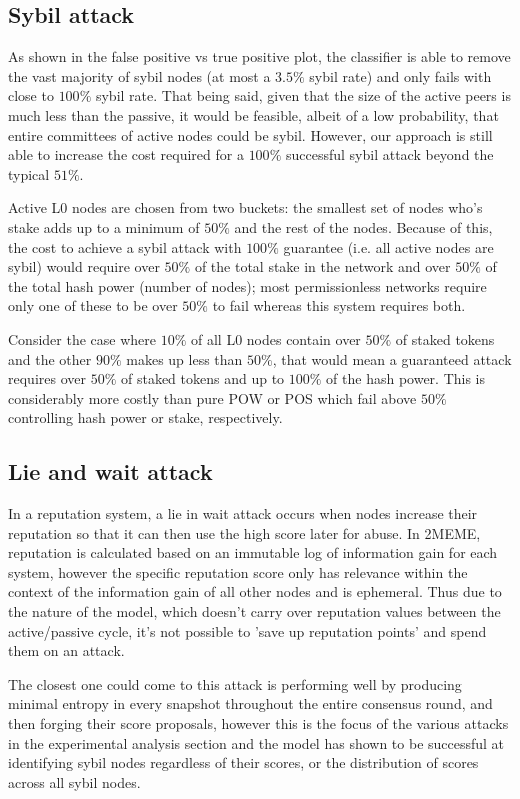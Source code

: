 \documentclass{article}
\begin{document}
\subsection{Sybil attack}
As shown in the false positive vs true positive plot, the classifier is able to remove the vast majority of sybil nodes (at most a $3.5\%$ sybil rate) and only fails with close to $100\%$ sybil rate. That being said, given that the size of the active peers is much less than the passive, it would be feasible, albeit of a low probability, that entire committees of active nodes could be sybil. However, our approach is still able to increase the cost required for a $100\%$ successful sybil attack beyond the typical $51\%$. 

Active L0 nodes are chosen from two buckets: the smallest set of nodes who's stake adds up to a minimum of $50\%$ and the rest of the nodes. Because of this, the cost to achieve a sybil attack with $100\%$ guarantee (i.e. all active nodes are sybil) would require over $50\%$ of the total stake in the network and over $50\%$ of the total hash power (number of nodes); most permissionless networks require only one of these to be over $50\%$ to fail whereas this system requires both.

Consider the case where $10\%$ of all L0 nodes contain over $50\%$ of staked tokens and the other $90\%$ makes up less than $50\%$, that would mean a guaranteed attack requires over $50\%$ of staked tokens and up to $100\%$ of the hash power. This is considerably more costly than pure POW or POS which fail above $50\%$ controlling hash power or stake, respectively.

\subsection{Lie and wait attack}
In a reputation system, a lie in wait attack occurs when nodes increase their reputation so that it can then use the high score later for abuse. In 2MEME, reputation is calculated based on an immutable log of information gain for each system, however the specific reputation score only has relevance within the context of the information gain of all other nodes and is ephemeral. Thus due to the nature of the model, which doesn't carry over reputation values between the active/passive cycle, it's not possible to 'save up reputation points' and spend them on an attack.

The closest one could come to this attack is performing well by producing minimal entropy in every snapshot throughout the entire consensus round, and then forging their score proposals, however this is the focus of the various attacks in the experimental analysis section and the model has shown to be successful at identifying sybil nodes regardless of their scores, or the distribution of scores across all sybil nodes.
\end{document}
